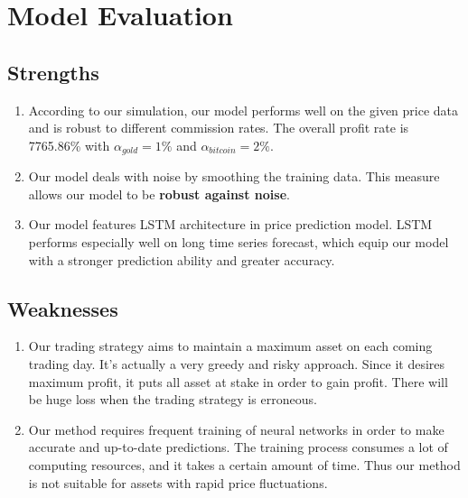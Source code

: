 \documentclass{mcmthesis}
\begin{document}
\section{Model Evaluation}
\subsection{Strengths}
    \begin{enumerate}
    \item According to our simulation, our model performs well on the given price data and is robust to different commission rates. The overall profit rate is 7765.86\% with $\alpha_{gold} = 1\%$  and  $\alpha_{bitcoin} = 2\%$.  
    
    \item Our model deals with noise by smoothing the training data. This measure allows our model to be \textbf{robust against noise}.
    
    \item Our model features LSTM architecture in price prediction model. LSTM performs especially well on long time series forecast, which equip our model with a stronger prediction ability and greater accuracy.
\end{enumerate}

\subsection{Weaknesses}
    \begin{enumerate}
    \item Our trading strategy aims to maintain a maximum asset on each coming trading day. It's actually a very greedy and risky approach. Since it desires maximum profit, it puts all asset at stake in order to gain profit. There will be huge loss when the trading strategy is erroneous.
    
    \item Our method requires frequent training of neural networks in order to make accurate and up-to-date predictions. The training process consumes a lot of computing resources, and it takes a certain amount of time. Thus our method is not suitable for assets with rapid price fluctuations.
    
    
\end{enumerate}
\newpage
\end{document}
